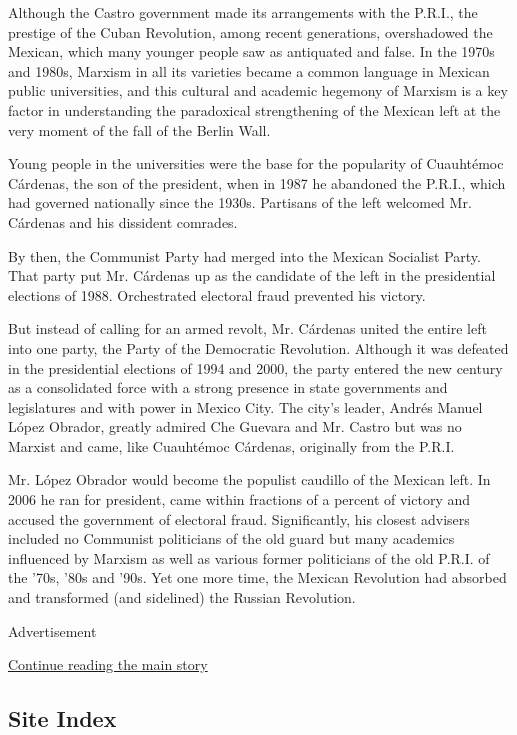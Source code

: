 Although the Castro government made its arrangements with the P.R.I.,
the prestige of the Cuban Revolution, among recent generations,
overshadowed the Mexican, which many younger people saw as antiquated
and false. In the 1970s and 1980s, Marxism in all its varieties became a
common language in Mexican public universities, and this cultural and
academic hegemony of Marxism is a key factor in understanding the
paradoxical strengthening of the Mexican left at the very moment of the
fall of the Berlin Wall.

Young people in the universities were the base for the popularity of
Cuauhtémoc Cárdenas, the son of the president, when in 1987 he abandoned
the P.R.I., which had governed nationally since the 1930s. Partisans of
the left welcomed Mr. Cárdenas and his dissident comrades.

By then, the Communist Party had merged into the Mexican Socialist
Party. That party put Mr. Cárdenas up as the candidate of the left in
the presidential elections of 1988. Orchestrated electoral fraud
prevented his victory.

But instead of calling for an armed revolt, Mr. Cárdenas united the
entire left into one party, the Party of the Democratic Revolution.
Although it was defeated in the presidential elections of 1994 and 2000,
the party entered the new century as a consolidated force with a strong
presence in state governments and legislatures and with power in Mexico
City. The city's leader, Andrés Manuel López Obrador, greatly admired
Che Guevara and Mr. Castro but was no Marxist and came, like Cuauhtémoc
Cárdenas, originally from the P.R.I.

Mr. López Obrador would become the populist caudillo of the Mexican
left. In 2006 he ran for president, came within fractions of a percent
of victory and accused the government of electoral fraud. Significantly,
his closest advisers included no Communist politicians of the old guard
but many academics influenced by Marxism as well as various former
politicians of the old P.R.I. of the '70s, '80s and '90s. Yet one more
time, the Mexican Revolution had absorbed and transformed (and
sidelined) the Russian Revolution.

Advertisement

\protect\hyperlink{after-bottom}{Continue reading the main story}

\hypertarget{site-index}{%
\subsection{Site Index}\label{site-index}}

